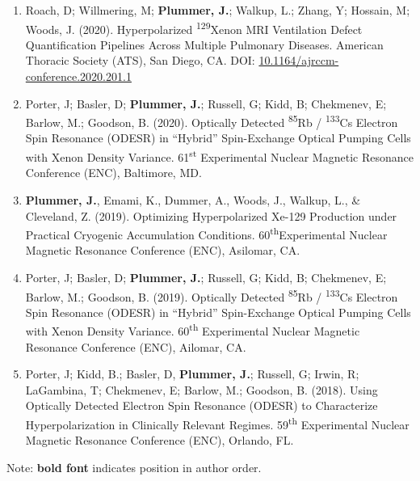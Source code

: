 \documentclass[12pt,]{scrartcl}
\begin{document}
\begin{enumerate}
  \item Roach, D; Willmering, M;\textbf{ Plummer, J.}; Walkup, L.; Zhang, Y; Hossain, M; Woods, J. (2020). Hyperpolarized \textsuperscript{129}Xenon MRI Ventilation Defect Quantification Pipelines Across Multiple Pulmonary Diseases. American Thoracic Society (ATS), San Diego, CA. DOI: \href{https://www.atsjournals.org/doi/pdf/10.1164/ajrccm-conference.2020.201.1_MeetingAbstracts.A7893}{10.1164/ajrccm-conference.2020.201.1}
  \item Porter, J; Basler, D; \textbf{Plummer, J.}; Russell, G; Kidd, B; Chekmenev, E; Barlow, M.; Goodson, B. (2020). Optically Detected \textsuperscript{85}Rb / \textsuperscript{133}Cs Electron Spin Resonance (ODESR) in “Hybrid” Spin-Exchange Optical Pumping Cells with Xenon Density Variance. 61\textsuperscript{st} Experimental Nuclear Magnetic Resonance Conference (ENC), Baltimore, MD. 
  \item \textbf{Plummer, J.}, Emami, K., Dummer, A., Woods, J., Walkup, L., \& Cleveland, Z. (2019). Optimizing Hyperpolarized Xe-129 Production under Practical Cryogenic Accumulation Conditions. 60\textsuperscript{th}Experimental Nuclear Magnetic Resonance Conference (ENC), Asilomar, CA. 
  \item Porter, J; Basler, D; \textbf{Plummer, J.}; Russell, G; Kidd, B; Chekmenev, E; Barlow, M.; Goodson, B. (2019). Optically Detected \textsuperscript{85}Rb / \textsuperscript{133}Cs Electron Spin Resonance (ODESR) in “Hybrid” Spin-Exchange Optical Pumping Cells with Xenon Density Variance. 60\textsuperscript{th} Experimental Nuclear Magnetic Resonance Conference (ENC), Ailomar, CA. 
  \item Porter, J; Kidd, B.; Basler, D, \textbf{Plummer, J.}; Russell, G; Irwin, R; LaGambina, T; Chekmenev, E; Barlow, M.; Goodson, B. (2018). Using Optically Detected Electron Spin Resonance (ODESR) to Characterize Hyperpolarization in Clinically Relevant Regimes. 59\textsuperscript{th} Experimental Nuclear Magnetic Resonance Conference (ENC), Orlando, FL. 

  
\end{enumerate}
Note: \textbf{bold font} indicates position in author order.


\end{document}
